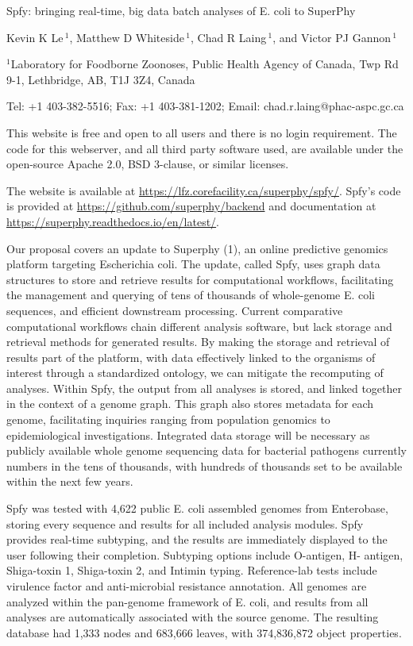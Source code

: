 \documentclass{article}
\begin{document}
Spfy: bringing real-time, big data batch analyses of E. coli to SuperPhy

Kevin K Le\,$^{1}$,
Matthew D Whiteside\,$^{1}$,
Chad R Laing\,$^{1}$,
and Victor PJ Gannon\,$^{1}$

$^{1}$Laboratory for Foodborne Zoonoses, Public Health Agency of Canada, Twp Rd 9-1, Lethbridge, AB, T1J 3Z4, Canada

Tel: +1 403-382-5516; Fax: +1 403-381-1202; Email: chad.r.laing@phac-aspc.gc.ca

This website is free and open to all users and there is no login requirement. The code for this webserver, and all third party software used, are available under the open-source Apache 2.0, BSD 3-clause, or similar licenses.

The website is available at \url{https://lfz.corefacility.ca/superphy/spfy/}. Spfy’s code is provided at \url{https://github.com/superphy/backend} and documentation at \url{https://superphy.readthedocs.io/en/latest/}.

Our proposal covers an update to Superphy (1), an online predictive genomics platform targeting Escherichia coli. The update, called Spfy, uses graph data structures to store and retrieve results for computational workflows, facilitating the management and querying of tens of thousands of whole-genome E. coli sequences, and efficient downstream processing. Current comparative computational workflows chain different analysis software, but lack storage and retrieval methods for generated results. By making the storage and retrieval of results part of the platform, with data effectively linked to the organisms of interest through a standardized ontology, we can mitigate the recomputing of analyses. Within Spfy, the output from all analyses is stored, and linked together in the context of a genome graph. This graph also stores metadata for each genome, facilitating inquiries ranging from population genomics to epidemiological investigations. Integrated data storage will be necessary as publicly available whole genome sequencing data for bacterial pathogens currently numbers in the tens of thousands, with hundreds of thousands set to be available within the next few years.

Spfy was tested with 4,622 public E. coli assembled genomes from Enterobase, storing every sequence and results for all included analysis modules. Spfy provides real-time subtyping, and the results are immediately displayed to the user following their completion. Subtyping options include O-antigen, H- antigen, Shiga-toxin 1, Shiga-toxin 2, and Intimin typing. Reference-lab tests include virulence factor and anti-microbial resistance annotation. All genomes are analyzed within the pan-genome framework of E. coli, and results from all analyses are automatically associated with the source genome. The resulting database had 1,333 nodes and 683,666 leaves, with 374,836,872 object properties.
\end{document}
